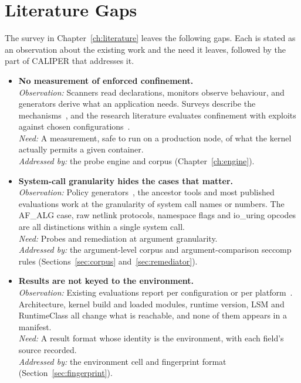 \chapter{Literature Gaps}
\label{ch:gaps}

The survey in Chapter~\ref{ch:literature} leaves the following gaps. Each is stated as an observation about the existing work and the need it leaves, followed by the part of CALIPER that addresses it.

\begin{itemize}[leftmargin=*,itemsep=5pt]
\item \textbf{No measurement of enforced confinement.}\\
\textit{Observation:} Scanners read declarations, monitors observe behaviour, and generators derive what an application needs. Surveys describe the mechanisms~\cite{pahl2019,casalicchio2020,watada2019,sultan2019,jarkas2025,devipriya2023}, and the research literature evaluates confinement with exploits against chosen configurations~\cite{lin2018,houdini}.\\
\textit{Need:} A measurement, safe to run on a production node, of what the kernel actually permits a given container.\\
\textit{Addressed by:} the probe engine and corpus (Chapter~\ref{ch:engine}).

\item \textbf{System-call granularity hides the cases that matter.}\\
\textit{Observation:} Policy generators~\cite{confine,sysfilter,temporal,c2c,chestnut,wan2019emse,speaker}, the ancestor tools and most published evaluations work at the granularity of system call names or numbers. The AF\_ALG case, raw netlink protocols, namespace flags and io\_uring opcodes are all distinctions within a single system call.\\
\textit{Need:} Probes and remediation at argument granularity.\\
\textit{Addressed by:} the argument-level corpus and argument-comparison seccomp rules (Sections~\ref{sec:corpus} and~\ref{sec:remediator}).

\item \textbf{Results are not keyed to the environment.}\\
\textit{Observation:} Existing evaluations report per configuration or per platform~\cite{lin2018,houdini,combe2016,martin2018}. Architecture, kernel build and loaded modules, runtime version, LSM and RuntimeClass all change what is reachable, and none of them appears in a manifest.\\
\textit{Need:} A result format whose identity is the environment, with each field's source recorded.\\
\textit{Addressed by:} the environment cell and fingerprint format (Section~\ref{sec:fingerprint}).


\end{itemize}
